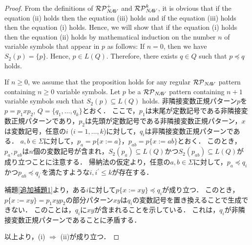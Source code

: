 \begin{proof}
From the definitions of $\mathcal{RP}^{+}_{N\!A\!V}$ and $\mathcal{RP}^{k}_{N\!A\!V}$, it is obvious that if the equation (ii) holds then the equation (iii) holds and if the equation (iii) holds then the equation (i) holds.
Hence, we will show that if the equation (i) holds then the equation (ii) holds
by mathematical induction on the number $n$ of variable symbols that appear in $p$ as follows:
%
If $n=0$, then we have $S_{2}(p)= \{ p \}$.
Hence, $p \in L(Q)$.
Therefore, there exists $q \in Q$ such that $p \preceq q$ holds.

If $n \ge 0$, we assume that the proposition holds for any regular $\mathcal{RP}_{N\!A\!V}$ pattern containing $n \ge 0$ variable symbols.
Let $p$ be a $\mathcal{RP}_{N\!A\!V}$ pattern containing $n+1$ variable symbols such that $S_{2}(p) \subseteq L(Q)$ holds.
非隣接変数正規パターン$p$を$p=p_{1}xp_{2}$, $Q=\{ q_{1}, \ldots , q_{k} \}$とおく．
ここで，$p_{1}$は末尾が定数記号である非隣接変数正規パターンであり，$p_{2}$は先頭が定数記号である非隣接変数正規パターン，$x$は変数記号，任意の$i$ ($i=1, \ldots, k$)に対して，$q_{i}$は非隣接変数正規パターンである．
$a, b \in \Sigma$に対して，$p_{a}=p \{ x := a \}$，$p_{ab}=p \{ x := ab \}$とおく．
このとき，$p_{a}, p_{ab}$は$n$個の変数記号が含まれ，$S_{2}(p_{a}) \subseteq L(Q)$かつ$S_{2}(p_{ab}) \subseteq L(Q)$が成り立つことに注意する．
帰納法の仮定より，任意の$a, b \in \Sigma$に対して，$p_{a} \preceq q_{i}$かつ$p_{ab} \preceq q_{i^{\prime}}$を満たすような$i, i^{\prime} \le k$が存在する．

補題\ref{追加補題1}より，ある$i$に対して$p \{ x:=xy \} \preceq q_{i}$が成り立つ．
このとき，$p \{ x:=xy \} =p_{1}xyp_{2}$の部分パターン$xy$は$q_{i}$の変数記号を置き換えることで生成できない．
このことは，$q_{i}$に$xy$が含まれることを示している．
これは，$q_{i}$が非隣接変数正規パターンであることに矛盾する．

以上より，(i) $\Rightarrow$ (ii)が成り立つ．
\end{proof}

